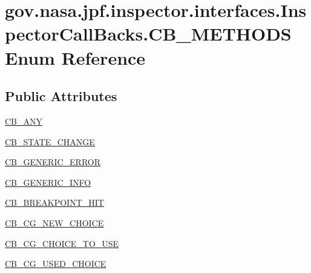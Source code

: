 \hypertarget{enumgov_1_1nasa_1_1jpf_1_1inspector_1_1interfaces_1_1_inspector_call_backs_1_1_c_b___m_e_t_h_o_d_s}{}\section{gov.\+nasa.\+jpf.\+inspector.\+interfaces.\+Inspector\+Call\+Backs.\+C\+B\+\_\+\+M\+E\+T\+H\+O\+DS Enum Reference}
\label{enumgov_1_1nasa_1_1jpf_1_1inspector_1_1interfaces_1_1_inspector_call_backs_1_1_c_b___m_e_t_h_o_d_s}
\subsection*{Public Attributes}
\begin{DoxyCompactItemize}
\item 
\hyperlink{enumgov_1_1nasa_1_1jpf_1_1inspector_1_1interfaces_1_1_inspector_call_backs_1_1_c_b___m_e_t_h_o_d_s_a87d962e960ff0677bf2325a90a531e61}{C\+B\+\_\+\+A\+NY}
\item 
\hyperlink{enumgov_1_1nasa_1_1jpf_1_1inspector_1_1interfaces_1_1_inspector_call_backs_1_1_c_b___m_e_t_h_o_d_s_ab2ca56f350245242d19bdb6cbcd38032}{C\+B\+\_\+\+S\+T\+A\+T\+E\+\_\+\+C\+H\+A\+N\+GE}
\item 
\hyperlink{enumgov_1_1nasa_1_1jpf_1_1inspector_1_1interfaces_1_1_inspector_call_backs_1_1_c_b___m_e_t_h_o_d_s_a27bfe89c7aca4474518966f9aa46322b}{C\+B\+\_\+\+G\+E\+N\+E\+R\+I\+C\+\_\+\+E\+R\+R\+OR}
\item 
\hyperlink{enumgov_1_1nasa_1_1jpf_1_1inspector_1_1interfaces_1_1_inspector_call_backs_1_1_c_b___m_e_t_h_o_d_s_abd8b6b34cabf4d866742d72ba140f5df}{C\+B\+\_\+\+G\+E\+N\+E\+R\+I\+C\+\_\+\+I\+N\+FO}
\item 
\hyperlink{enumgov_1_1nasa_1_1jpf_1_1inspector_1_1interfaces_1_1_inspector_call_backs_1_1_c_b___m_e_t_h_o_d_s_a7e99fa3c2f2ede89ef9223836fe06bbf}{C\+B\+\_\+\+B\+R\+E\+A\+K\+P\+O\+I\+N\+T\+\_\+\+H\+IT}
\item 
\hyperlink{enumgov_1_1nasa_1_1jpf_1_1inspector_1_1interfaces_1_1_inspector_call_backs_1_1_c_b___m_e_t_h_o_d_s_a8a96693b7f439f0cefd0c31099c502cc}{C\+B\+\_\+\+C\+G\+\_\+\+N\+E\+W\+\_\+\+C\+H\+O\+I\+CE}
\item 
\hyperlink{enumgov_1_1nasa_1_1jpf_1_1inspector_1_1interfaces_1_1_inspector_call_backs_1_1_c_b___m_e_t_h_o_d_s_a5f2445ac00ef4121d8d4b766f24ca461}{C\+B\+\_\+\+C\+G\+\_\+\+C\+H\+O\+I\+C\+E\+\_\+\+T\+O\+\_\+\+U\+SE}
\item 
\hyperlink{enumgov_1_1nasa_1_1jpf_1_1inspector_1_1interfaces_1_1_inspector_call_backs_1_1_c_b___m_e_t_h_o_d_s_a09a4389ec1ede421c87feaa2d875e8f0}{C\+B\+\_\+\+C\+G\+\_\+\+U\+S\+E\+D\+\_\+\+C\+H\+O\+I\+CE}
\end{DoxyCompactItemize}


